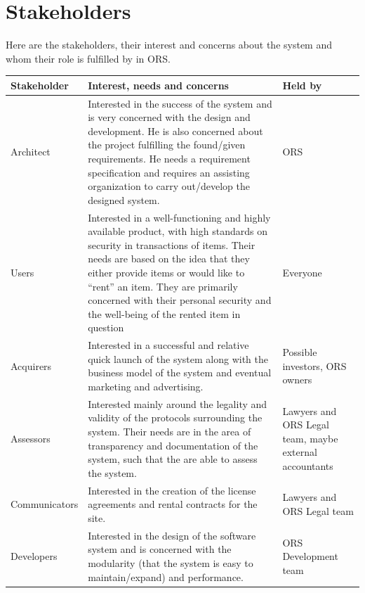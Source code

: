 \documentclass[a4paper,11pt]{report}
\begin{document}
\section{Stakeholders}
\label{sec:stakeholders}
Here are the stakeholders, their interest and concerns about the system and whom their role is fulfilled by in ORS.
\begin{center}
    \begin{longtable}[H]{| l |  p{6cm} | p{2cm} |}
    \hline
    \textbf{Stakeholder} & \textbf{Interest, needs and concerns} & \textbf{Held
        by} \\
    \hline
    Architect & Interested in the success of the system and is very concerned
        with the design and development. He is also concerned about the project
        fulfilling the found/given requirements. He needs a requirement
        specification and requires an assisting organization to carry
        out/develop the designed system. & ORS \\
    \hline
    Users &  Interested in a well-functioning and highly available product,
        with high standards on security in transactions of items. Their needs
        are based on the idea that they either provide items or would like to
        ``rent'' an item. They are primarily concerned with their personal
        security and the well-being of the rented item in question & Everyone \\
    \hline
    Acquirers & Interested in a successful and relative quick launch of the 
        system along with the business model of the system and eventual 
        marketing and advertising. & Possible investors, ORS owners \\
    \hline
    Assessors & Interested mainly around the legality and validity of the
        protocols surrounding the system. Their needs are in the area of
        transparency and documentation of the system, such that the are able to
        assess the system. & Lawyers and ORS Legal team, maybe external
        accountants\\
    \hline
    Communicators & Interested in the creation of the license agreements and 
        rental contracts for the site. & Lawyers and ORS Legal team\\
    \hline
    Developers & Interested in the design of the software system and is 
        concerned with the modularity (that the system is easy to 
        maintain/expand) and performance. & ORS Development team\\

\end{longtable}
\end{center}
\end{document}
